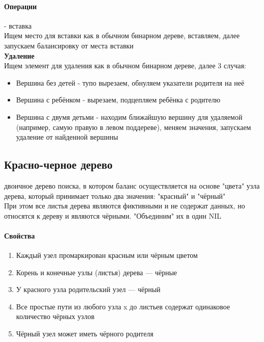 \documentclass[a4paper,10pt]{article}
\begin{document}
	\paragraph{Операции} - вставка \\
	Ищем место для вставки как в обычном бинарном дереве, вставляем, далее запускаем балансировку от места вставки \\
	\textbf{Удаление} \\
	Ищем элемент для удаления как в обычном бинарном дереве, далее 3 случая:
	\begin{itemize}
		\item Вершина без детей - тупо вырезаем, обнуляем указатели родителя на неё
		\item Вершина с ребёнком - вырезаем, подцепляем ребёнка с родителю
		\item Вершина с двумя детьми - находим ближайшую вершину для удаляемой (например, самую правую в левом поддереве), меняем значения, запускаем удаление от найденной вершины
	\end{itemize}

\subsection{Красно-черное дерево}
 двоичное дерево поиска, в котором баланс осуществляется на основе "цвета" узла дерева, который принимает только два значения: "красный" и "чёрный"\\
При этом все листья дерева являются фиктивными и не содержат данных, но относятся к дереву и являются чёрными. "Объединим" их в один NIL\\
\paragraph{Свойства}
\begin{enumerate}
	\item Каждый узел промаркирован красным или чёрным цветом
	\item Корень и конечные узлы (листья) дерева — чёрные
	\item У красного узла родительский узел — чёрный
	\item Все простые пути из любого узла x до листьев содержат одинаковое количество чёрных узлов
	\item Чёрный узел может иметь чёрного родителя
\end{enumerate}
\end{document}
